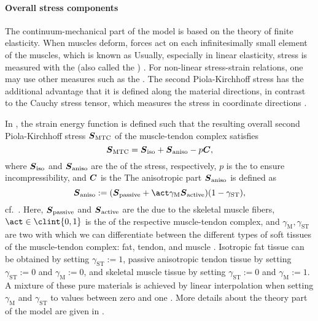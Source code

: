 \paragraph{Overall stress components}

The continuum-mechanical part of the model
is based on the theory of finite elasticity.
When muscles deform, forces act on each infinitesimally small element
of the muscles, which is known as 
Usually, especially in linear elasticity,
stress is measured with the 
(also called the ) \cite{Soennerlind13Why}.
For non-linear stress-strain relations,
one may use other measures such as the
.
The second Piola-Kirchhoff stress has the additional advantage
that it is defined along the material directions,
in contrast to the Cauchy stress tensor,
which measures the stress in coordinate directions \cite{Soennerlind13Why}.

In ,
the strain energy function is defined such that the
resulting overall second Piola-Kirchhoff stress ${\boldsymbol{S}}_\mathrm{MTC}$ of
the muscle-tendon complex satisfies
\begin{equation}
  {\boldsymbol{S}}_\mathrm{MTC}
  = {\boldsymbol{S}}_\mathrm{iso} + {\boldsymbol{S}}_\mathrm{aniso} - p {\boldsymbol{C}},
\end{equation}
where ${\boldsymbol{S}}_\mathrm{iso}$ and ${\boldsymbol{S}}_\mathrm{aniso}$
are the  of the stress, respectively,
$p$ is the  to ensure incompressibility,
and ${\boldsymbol{C}}$ is the 
The anisotropic part ${\boldsymbol{S}}_\mathrm{aniso}$ is defined as
\begin{equation}
  \mat{S}_\mathrm{aniso}
  := (
    \mat{S}_\mathrm{passive} +
    \act \gamma_\mathrm{M} \mat{S}_\mathrm{active}
  ) (1 - \gamma_\mathrm{ST}),
\end{equation}
cf.\ \cite{Valentin18Gradient}.
Here, ${\boldsymbol{S}}_\mathrm{passive}$ and ${\boldsymbol{S}}_\mathrm{active}$
are the 
due to the skeletal muscle fibers,
$\act \in \clint{0, 1}$ is the  of the
respective muscle-tendon complex, and
$\gamma_\mathrm{M}, \gamma_\mathrm{ST}$ are two 
with which we can differentiate between the different types of soft tissues
of the muscle-tendon complex: fat, tendon, and muscle
\cite{Valentin18Gradient}.
Isotropic fat tissue can be obtained
by setting $\gamma_\mathrm{ST} := 1$,
passive anisotropic tendon tissue
by setting $\gamma_\mathrm{ST} := 0$ and $\gamma_\mathrm{M} := 0$, and
skeletal muscle tissue
by setting $\gamma_\mathrm{ST} := 0$ and $\gamma_\mathrm{M} := 1$.
A mixture of these pure materials is
achieved by linear interpolation when setting
$\gamma_\mathrm{M}$ and $\gamma_\mathrm{ST}$ to values between zero and one
\cite{Valentin18Gradient}.
More details about the theory part of the model are given in
.
